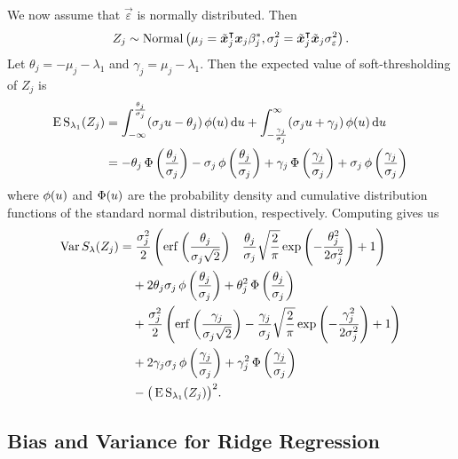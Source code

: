 We now assume that \(\vec{\varepsilon}\) is normally distributed. Then
\[
  {Z_j} \sim \operatorname{Normal}\left(\mu_j = \tilde{\boldsymbol{x}}_j^\intercal\boldsymbol{x}_j \beta_j^*, \sigma_j^2 = \tilde{\boldsymbol{x}}_j^\intercal\tilde{\boldsymbol{x}}_j \sigma_\varepsilon^2 \right).
\]
Let \(\theta_j = -\mu_j -\lambda_1 \) and \(\gamma_j = \mu_j - \lambda_1\). Then the
expected value of soft-thresholding of \({Z_j}\) is
\begin{align*}
  \operatorname{E} \operatorname{S}_{\lambda_1}({Z_j}) & = \int_{-\infty}^\frac{\theta_j}{\sigma_j} (\sigma_j u - \theta_j) \operatorname{\phi}(u) \mathop{}\!\mathrm{d} u + \int_{-\frac{\gamma_j}{\sigma_j}}^\infty (\sigma_j u + \gamma_j) \operatorname{\phi}(u) \mathop{}\!\mathrm{d} u                                               \nonumber \\
                            & = -\theta_j \operatorname{\Phi}\left(\frac{\theta_j}{\sigma_j}\right) - \sigma_j \operatorname{\phi}\left(\frac{\theta_j}{\sigma_j}\right) + \gamma_j \operatorname{\Phi}\left(\frac{\gamma_j}{\sigma_j}\right) + \sigma_j \operatorname{\phi}\left(\frac{\gamma_j}{\sigma_j}\right)
\end{align*}
where \(\operatorname{\phi}(u)\) and \(\operatorname{\Phi}(u)\) are the probability density and cumulative distribution
functions of the standard normal distribution, respectively. Computing  gives us
\begin{align*}
  \var{S_\lambda(Z_j)} & = \frac{\sigma_j^2}{2} \left( \erf\left(\frac{\theta_j}{\sigma_j\sqrt{2}}\right) \phantom{-{}} \frac{\theta_j}{\sigma_j}\sqrt{\frac{2}{\pi}} \exp\left(-\frac{\theta_j^2}{2\sigma_j^2}\right) + 1 \right)  \nonumber  \\
                       & \phantom{={}} + 2 \theta_j \sigma_j \pdf \left(\frac{\theta_j}{\sigma_j}\right) + \theta_j^2 \cdf\left(\frac{\theta_j}{\sigma_j}\right) \nonumber                                                                     \\
                       & \phantom{={}} + \frac{\sigma_j^2}{2} \left( \erf\left(\frac{\gamma_j}{\sigma_j\sqrt{2}}\right) - \frac{\gamma_j}{\sigma_j}\sqrt{\frac{2}{\pi}} \exp\left(-\frac{\gamma_j^2}{2\sigma_j^2}\right) + 1 \right) \nonumber \\
                       & \phantom{={}} + 2 \gamma_j \sigma_j \pdf \left(\frac{\gamma_j}{\sigma_j}\right) + \gamma_j^2 \cdf\left(\frac{\gamma_j}{\sigma_j}\right) \nonumber                                                                     \\
                       & \phantom{={}} - \big(\E \st_{\lambda_1}({Z_j})\big)^2.
\end{align*}

\subsection{Bias and Variance for Ridge Regression}%
\label{sec:ridge-variance}

